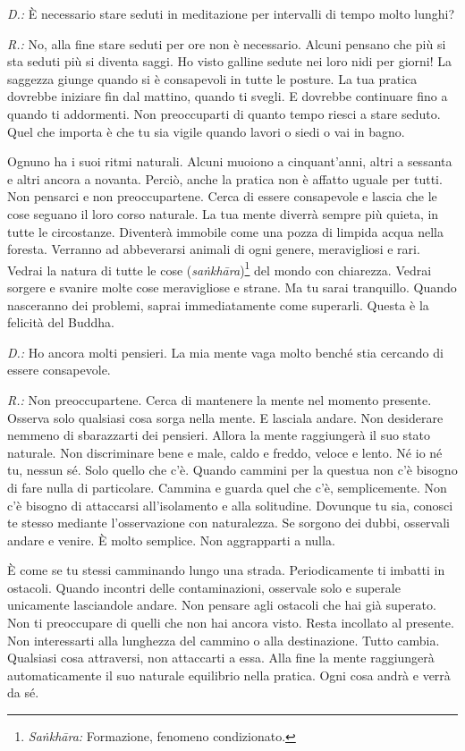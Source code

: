 \emph{D.:} È necessario stare seduti in meditazione per intervalli di tempo
molto lunghi?

\emph{R.:} No, alla fine stare seduti per ore non è necessario. Alcuni pensano
che più si sta seduti più si diventa saggi. Ho visto galline sedute nei
loro nidi per giorni! La saggezza giunge quando si è consapevoli in
tutte le posture. La tua pratica dovrebbe iniziare fin dal mattino,
quando ti svegli. E dovrebbe continuare fino a quando ti addormenti. Non
preoccuparti di quanto tempo riesci a stare seduto. Quel che importa è
che tu sia vigile quando lavori o siedi o vai in bagno.

Ognuno ha i suoi ritmi naturali. Alcuni muoiono a cinquant'anni, altri a
sessanta e altri ancora a novanta. Perciò, anche la pratica non è
affatto uguale per tutti. Non pensarci e non preoccupartene. Cerca di
essere consapevole e lascia che le cose seguano il loro corso naturale.
La tua mente diverrà sempre più quieta, in tutte le circostanze.
Diventerà immobile come una pozza di limpida acqua nella foresta.
Verranno ad abbeverarsi animali di ogni genere, meravigliosi e rari.
Vedrai la natura di tutte le cose (\emph{saṅkhāra})\footnote{\emph{Saṅkhāra:}
  Formazione, fenomeno condizionato.} del mondo con chiarezza. Vedrai
sorgere e svanire molte cose meravigliose e strane. Ma tu sarai
tranquillo. Quando nasceranno dei problemi, saprai immediatamente come
superarli. Questa è la felicità del Buddha.

\emph{D.:} Ho ancora molti pensieri. La mia mente vaga molto benché stia
cercando di essere consapevole.

\emph{R.:} Non preoccupartene. Cerca di mantenere la mente nel momento
presente. Osserva solo qualsiasi cosa sorga nella mente. E lasciala
andare. Non desiderare nemmeno di sbarazzarti dei pensieri. Allora la
mente raggiungerà il suo stato naturale. Non discriminare bene e male,
caldo e freddo, veloce e lento. Né io né tu, nessun sé. Solo quello che
c'è. Quando cammini per la questua non c'è bisogno di fare nulla di
particolare. Cammina e guarda quel che c'è, semplicemente. Non c'è
bisogno di attaccarsi all'isolamento e alla solitudine. Dovunque tu sia,
conosci te stesso mediante l'osservazione con naturalezza. Se sorgono
dei dubbi, osservali andare e venire. È molto semplice. Non aggrapparti
a nulla.

È come se tu stessi camminando lungo una strada. Periodicamente ti
imbatti in ostacoli. Quando incontri delle contaminazioni, osservale
solo e superale unicamente lasciandole andare. Non pensare agli ostacoli
che hai già superato. Non ti preoccupare di quelli che non hai ancora
visto. Resta incollato al presente. Non interessarti alla lunghezza del
cammino o alla destinazione. Tutto cambia. Qualsiasi cosa attraversi,
non attaccarti a essa. Alla fine la mente raggiungerà automaticamente il
suo naturale equilibrio nella pratica. Ogni cosa andrà e verrà da sé.

